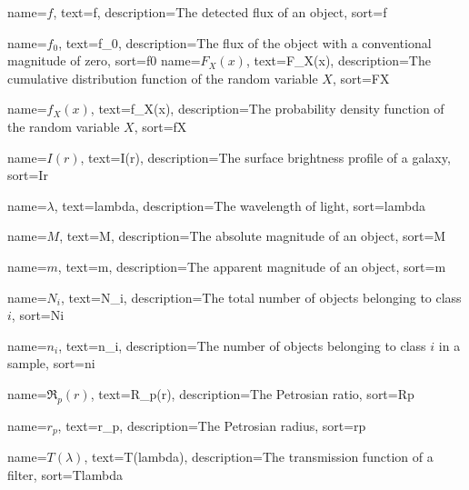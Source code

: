 %
{%
	name={$f$},
	text={f},
	description={The detected flux of an object},
	sort={f}
}

%
{%
	name={$f_0$},
	text={f_0},
	description={The flux of the object with a conventional magnitude of zero},
	sort={f0}
}
%
{%
	name={$F_X(x)$},
	text={F_X(x)},
	description={The cumulative distribution function of the random variable $X$},
	sort={FX}
}

%
{%
	name={$f_X(x)$},
	text={f_X(x)},
	description={The probability density function of the random variable $X$},
	sort={fX}
}

%
{%
	name={$I(r)$},
	text={I(r)},
	description={The surface brightness profile of a galaxy},
	sort={Ir}
}

%
{%
	name={$\lambda$},
	text={lambda},
	description={The wavelength of light},
	sort={lambda}
}

%
{%
	name={$M$},
	text={M},
	description={The absolute magnitude of an object},
	sort={M}
}

%
{%
	name={$m$},
	text={m},
	description={The apparent magnitude of an object},
	sort={m}
}

%
{%
	name={$N_i$},
	text={N_i},
	description={The total number of objects belonging to class $i$},
	sort={Ni}
}

%
{%
	name={$n_i$},
	text={n_i},
	description={The number of objects belonging to class $i$ in a sample},
	sort={ni}
}

%
{%
	name={$\mathfrak{R}_p(r)$},
	text={R_p(r)},
	description={The Petrosian ratio},
	sort={Rp}
}

%
{%
	name={$r_p$},
	text={r_p},
	description={The Petrosian radius},
	sort={rp}
}


%
{%
	name={$T(\lambda)$},
	text={T(lambda)},
	description={The transmission function of a filter},
	sort={Tlambda}
}





